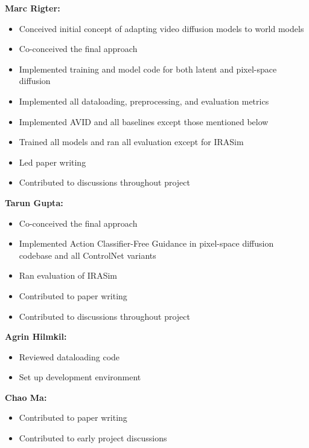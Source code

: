 \small 
\smallskip
\textbf{Marc Rigter:}
\vspace{-2mm}
\begin{itemize}[noitemsep, left=0pt]
    \item Conceived initial concept of adapting video diffusion models to world models
    \item Co-conceived the final approach
    \item Implemented training and model code for both latent and pixel-space diffusion
    \item Implemented all dataloading, preprocessing, and evaluation metrics
    \item Implemented AVID and all baselines except those mentioned below
    \item Trained all models and ran all evaluation except for IRASim
    \item Led paper writing
    \item Contributed to discussions throughout project
\end{itemize}

\textbf{Tarun Gupta:}
\vspace{-2mm}
\begin{itemize}[noitemsep, left=0pt]
    \item Co-conceived the final approach
    \item Implemented Action Classifier-Free Guidance in pixel-space diffusion codebase and all ControlNet variants
    \item Ran evaluation of IRASim
    \item Contributed to paper writing
    \item Contributed to discussions throughout project
\end{itemize}

\textbf{Agrin Hilmkil:}
\vspace{-2mm}
\begin{itemize}[noitemsep, left=0pt]
\item Reviewed dataloading code
\item Set up development environment
\end{itemize}

\textbf{Chao Ma:}
\vspace{-2mm}
\begin{itemize}[noitemsep, left=0pt]
    \item Contributed to paper writing
    \item Contributed to early project discussions
\end{itemize}
